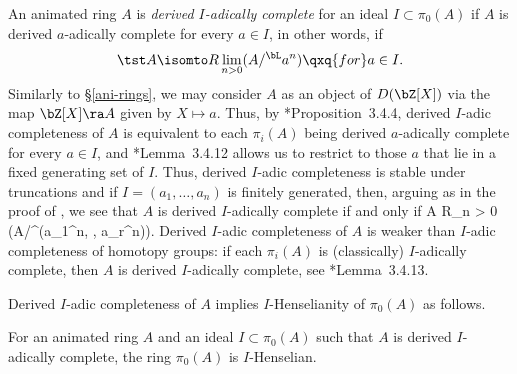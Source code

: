  \label{pp:derived-complete}
An animated ring $A$ is \emph{derived $I$-adically complete} for an ideal $I \subset \pi_0(A)$ if $A$ is derived $a$-adically complete for every $a \in I$, in other words, if
\[
\tst A \isomto R\lim_{n > 0} (A/^\bL a^n) \qxq{for} a \in I.
\]
Similarly to \S\ref{ani-rings}, we may consider $A$ as an object of $D(\bZ[X])$ via the map $\bZ[X] \ra A$ given by $X\mapsto a$. Thus, by \cite{BS15}*{Proposition~3.4.4}, derived $I$-adic completeness of $A$ is equivalent to each $\pi_i(A)$ being derived $a$-adically complete for every $a \in I$, and \cite{BS15}*{Lemma~3.4.12} allows us to restrict to those $a$ that lie in a fixed generating set of $I$. Thus, derived $I$-adic completeness is stable under truncations and if $I = (a_1, \dotsc, a_n)$ is finitely generated, then, arguing as in the proof of , we see that $A$ is derived $I$-adically complete if and only if
\be \label{eqn:continuity-condition}
\tst A \isomto R\lim_{n > 0} (A/^\bL (a_1^n, \dotsc, a_r^n)).
\ee
Derived $I$-adic completeness of $A$ is weaker than $I$-adic completeness of homotopy groups: if each $\pi_i(A)$ is (classically) $I$-adically complete, then $A$ is derived $I$-adically complete, see \cite{BS15}*{Lemma~3.4.13}.
\epp


Derived $I$-adic completeness of $A$ implies $I$-Henselianity of $\pi_0(A)$ as follows.




\blem \label{lem:DC-comp-Hens}
For an animated ring $A$ and an ideal $I \subset \pi_0(A)$ such that $A$ is derived $I$-adically complete, the ring $\pi_0(A)$ is $I$-Henselian. %
\elem

